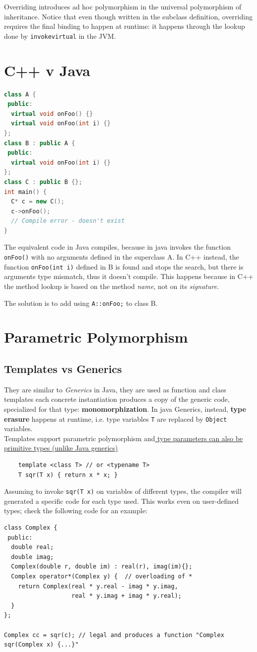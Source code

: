 Overriding introduces ad hoc polymorphism in the universal polymorphism of inheritance.
Notice that even though written in the subclass definition, overriding requires the final binding to happen at runtime:
it happens through the lookup done by \lstinline{invokevirtual} in the JVM.

\section{C++ v Java}
\begin{lstlisting}[language=C++]
class A {
 public:
  virtual void onFoo() {}
  virtual void onFoo(int i) {}
};
class B : public A {
 public:
  virtual void onFoo(int i) {}
};
class C : public B {};
int main() {
  C* c = new C();
  c->onFoo();
  // Compile error - doesn't exist
}
\end{lstlisting}
The equivalent code in Java compiles, because in java invokes the function \lstinline{onFoo()} with no arguments defined in the superclass A.
In C++ instead, the function \lstinline|onFoo(int i)| defined in B is found and stops the search, but there is arguments type mismatch, thus it doesn't compile.
This happens because in C++ the method lookup is based on the method \textit{name}, not on its \textit{signature}.

The solution is to add using \lstinline|A::onFoo;| to class B.

\section{Parametric Polymorphism}
\subsection{Templates vs Generics}
\lstset{language=C++}

They are similar to \textit{Generics} in Java, 
they are used as function and class templates
each concrete instantiation produces a copy of the generic code, specialized for that type:
\textbf{monomorphization}.
In java Generics, instead, \textbf{type erasure} happens at runtime, i.e. type variables \lstinline{T} are replaced by \lstinline{Object} variables.\\
Templates support parametric polymorphism and\ul{ type parameters can also be primitive types (unlike Java generics)}
\begin{lstlisting}
    template <class T> // or <typename T>
    T sqr(T x) { return x * x; }
\end{lstlisting}
Assuming to invoke \lstinline{sqr(T x)} on variables of different types, the compiler will generated a specific code for each type used.
This works even on user-defined types;
check the following code for an example:
\begin{lstlisting}
class Complex {
 public:
  double real;
  double imag;
  Complex(double r, double im) : real(r), imag(im){};
  Complex operator*(Complex y) {  // overloading of *
    return Complex(real * y.real - imag * y.imag,
                   real * y.imag + imag * y.real);
  }
};

Complex cc = sqr(c); // legal and produces a function "Complex sqr(Complex x) {...}"
\end{lstlisting}

